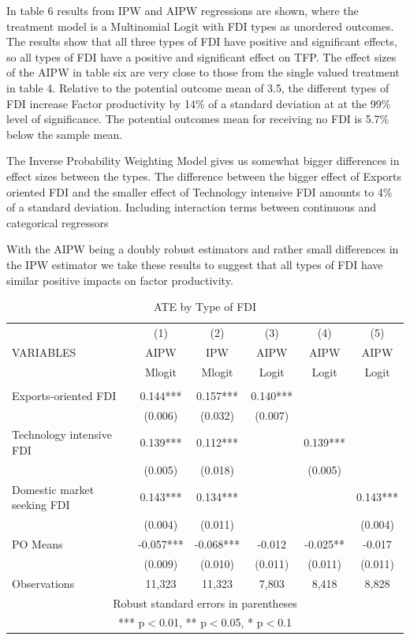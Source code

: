 \documentclass[a4paper,11pt]{scrartcl}
\begin{document}
In table 6 results from IPW and AIPW regressions are shown, where the treatment model is a Multinomial Logit with FDI types as unordered outcomes. The results show that all three types of FDI have positive and significant effects, so all types of FDI have a positive and significant effect on TFP. The effect sizes of the AIPW in table six are very close to those from the single valued treatment in table 4. Relative to the potential outcome mean of 3.5, the different types of FDI increase Factor productivity by 14\% of a standard deviation at at the 99\% level of significance.	The potential outcomes mean for receiving no FDI is 5.7\% below the sample mean. 

The Inverse Probability Weighting Model gives us somewhat bigger differences in effect sizes between the types. The difference between the bigger effect of Exports oriented FDI and the smaller effect of Technology intensive FDI amounts to 4\% of a standard deviation. Including interaction terms between continuous and categorical regressors 

With the AIPW being a doubly robust estimators and rather small differences in the IPW estimator we take these results to suggest that all types of FDI have similar positive impacts on factor productivity. 


\begin{table}[htbp]\centering
\caption{ATE by Type of FDI}
\begin{tabular}{lccccc} \hline
 & (1) & (2) & (3) & (4) & (5) \\
VARIABLES & AIPW & IPW  & AIPW  & AIPW & AIPW \\ 
&Mlogit&Mlogit&Logit&Logit&Logit\\
\hline
 &  &  &  &  &   \\
Exports-oriented FDI & 0.144*** &   0.157*** & 0.140*** &  &  \\
 & (0.006) &   (0.032) & (0.007) &  &\\
Technology intensive FDI & 0.139***   & 0.112*** &  & 0.139*** &   \\
 & (0.005)  & (0.018) &  &  (0.005)&  \\
Domestic market seeking FDI & 0.143*** &   0.134*** &  &  &0.143*** \\
 & (0.004)   & (0.011) &  &  & (0.004)  \\
PO Means &   -0.057*** &   -0.068*** &-0.012  &-0.025**  & -0.017    \\
 &   (0.009) &   (0.010) &  (0.011)&(0.011)  & (0.011) \\
 Observations & 11,323  & 11,323 &  7,803  & 8,418 & 8,828  \\ \hline
\multicolumn{6}{c}{ Robust standard errors in parentheses} \\
\multicolumn{6}{c}{ *** p$<$0.01, ** p$<$0.05, * p$<$0.1} \\
\end{tabular}
\end{table}
\end{document}
